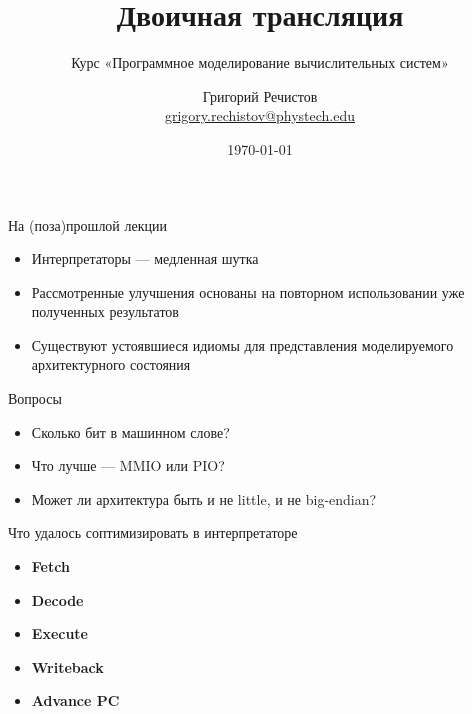 \documentclass{beamer}
\title{Двоичная трансляция}
\subtitle{Курс «Программное моделирование вычислительных систем»}
\author[]{Григорий Речистов \\ \small{\href{mailto:grigory.rechistov@phystech.edu}{grigory.rechistov@phystech.edu}}}
\date{\today}
\begin{document}
\begin{frame}
    \maketitle
\end{frame}

\begin{frame}
    \tableofcontents
\end{frame}


\begin{frame}{На (поза)прошлой лекции}
\begin{itemize}
\item Интерпретаторы — медленная шутка
\item Рассмотренные улучшения основаны на повторном использовании уже полученных результатов
\item Существуют устоявшиеся идиомы для представления моделируемого архитектурного состояния
\end{itemize}
\end{frame}

\begin{frame}{Вопросы}
\begin{itemize}
\item Сколько бит в машинном слове? \pause
\item Что лучше — MMIO или PIO?\pause
\item Может ли архитектура быть и не little, и не big-endian?
\end{itemize}

\end{frame}


\begin{frame}{Что удалось соптимизировать в интерпретаторе}
\begin{itemize}
\item \textbf<1>{Fetch} \only<1>{$\leftarrow$ оптимизировано}
\item \textbf<1>{Decode} 
\item \textbf<2>{Execute} 
\item \textbf<2>{Writeback} 
\item \textbf<2>{Advance PC} 
\end{itemize}

\end{frame}
\end{document}
